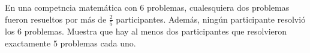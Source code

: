 En una competncia matemática con $6$ problemas, cualesquiera dos problemas fueron resueltos por más de $\frac 25$ participantes. Además, ningún participante resolvió los $6$ problemas. Muestra que hay al menos dos participantes que resolvieron exactamente $5$ problemas cada uno.